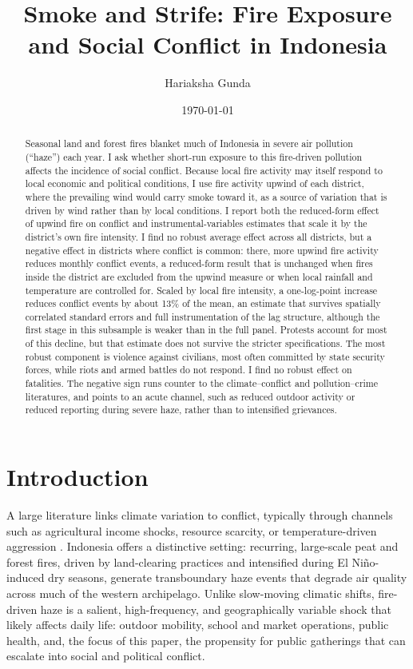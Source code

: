 \documentclass[12pt]{article}
\title{Smoke and Strife: Fire Exposure and Social Conflict in Indonesia}
\author{Hariaksha Gunda}
\affil{The University of Alabama}
\date{\today}
\begin{document}
\maketitle

\begin{abstract}
Seasonal land and forest fires blanket much of Indonesia in severe air pollution (``haze'') each year. I ask whether short-run exposure to this fire-driven pollution affects the incidence of social conflict. Because local fire activity may itself respond to local economic and political conditions, I use fire activity upwind of each district, where the prevailing wind would carry smoke toward it, as a source of variation that is driven by wind rather than by local conditions. I report both the reduced-form effect of upwind fire on conflict and instrumental-variables estimates that scale it by the district's own fire intensity. I find no robust average effect across all districts, but a negative effect in districts where conflict is common: there, more upwind fire activity reduces monthly conflict events, a reduced-form result that is unchanged when fires inside the district are excluded from the upwind measure or when local rainfall and temperature are controlled for. Scaled by local fire intensity, a one-log-point increase reduces conflict events by about 13\% of the mean, an estimate that survives spatially correlated standard errors and full instrumentation of the lag structure, although the first stage in this subsample is weaker than in the full panel. Protests account for most of this decline, but that estimate does not survive the stricter specifications. The most robust component is violence against civilians, most often committed by state security forces, while riots and armed battles do not respond. I find no robust effect on fatalities. The negative sign runs counter to the climate--conflict and pollution--crime literatures, and points to an acute channel, such as reduced outdoor activity or reduced reporting during severe haze, rather than to intensified grievances.
\end{abstract}

\section{Introduction}

A large literature links climate variation to conflict, typically through channels such as agricultural income shocks, resource scarcity, or temperature-driven aggression \citep{hsiang2013quantifying}. Indonesia offers a distinctive setting: recurring, large-scale peat and forest fires, driven by land-clearing practices and intensified during El Ni\~{n}o-induced dry seasons, generate transboundary haze events that degrade air quality across much of the western archipelago. Unlike slow-moving climatic shifts, fire-driven haze is a salient, high-frequency, and geographically variable shock that likely affects daily life: outdoor mobility, school and market operations, public health, and, the focus of this paper, the propensity for public gatherings that can escalate into social and political conflict.
\end{document}
